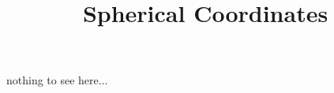 \documentclass{ximera}
\title{Spherical Coordinates}
\begin{document}
\begin{abstract}
\end{abstract}
\maketitle

nothing to see here...
\end{document}
